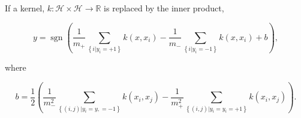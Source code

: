 \documentclass{article}[12pt]
\newcommand{\bR}{\mathbb{R}}
\newcommand{\sH}{{\mathcal H}}
\newcommand{\ra}{\rightarrow}
\begin{document}
If a kernel, $k: \sH \times \sH \ra \bR$ is replaced by the inner product,

\begin{equation}
y=\operatorname{sgn}\left(\frac{1}{m_{+}} \sum_{\left\{i | y_{i}=+1\right\}} k\left(x, x_{i}\right)-\frac{1}{m_{-}} \sum_{\left\{i | y_{i}=-1\right\}} k\left(x, x_{i}\right)+b\right),
\end{equation}

where

\begin{equation}
b =\frac{1}{2}\left(\frac{1}{m_{-}^{2}} \sum_{\left\{(i, j) | y_{i}=y,=-1\right\}} k\left(x_{i}, x_{j}\right)-\frac{1}{m_{+}^{2}} \sum_{\left\{(i, j) | y_{i}=y_{i}=+1\right\}} k\left(x_{i}, x_{j}\right)\right).
\end{equation}
\end{document}
